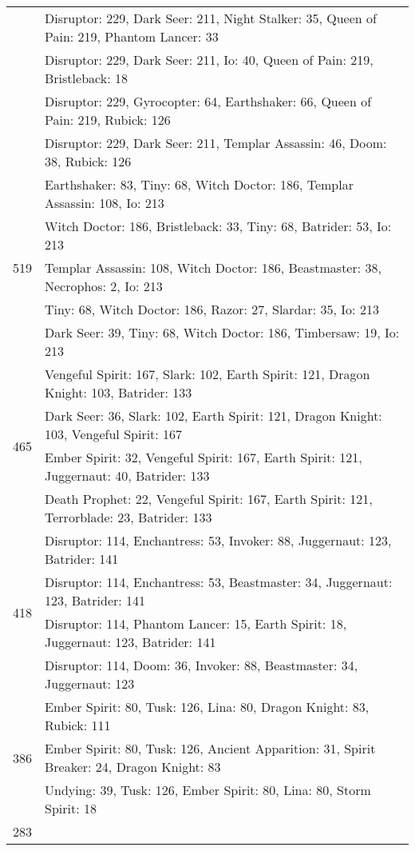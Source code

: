 \documentclass[result.tex]{subfiles}
\begin{document}
\begin{table}[H]
\begin{tabular}{ | c | p{12.5cm} | }
& Disruptor: 229, Dark Seer: 211, Night Stalker: 35, Queen of Pain: 219, Phantom Lancer: 33 \\
& Disruptor: 229, Dark Seer: 211, Io: 40, Queen of Pain: 219, Bristleback: 18 \\
& Disruptor: 229, Gyrocopter: 64, Earthshaker: 66, Queen of Pain: 219, Rubick: 126 \\
& Disruptor: 229, Dark Seer: 211, Templar Assassin: 46, Doom: 38, Rubick: 126 \\
\hline
\multirow{5}{*}{519}
& Earthshaker: 83, Tiny: 68, Witch Doctor: 186, Templar Assassin: 108, Io: 213 \\
& Witch Doctor: 186, Bristleback: 33, Tiny: 68, Batrider: 53, Io: 213 \\
& Templar Assassin: 108, Witch Doctor: 186, Beastmaster: 38, Necrophos: 2, Io: 213 \\
& Tiny: 68, Witch Doctor: 186, Razor: 27, Slardar: 35, Io: 213 \\
& Dark Seer: 39, Tiny: 68, Witch Doctor: 186, Timbersaw: 19, Io: 213 \\
\hline
\multirow{4}{*}{465}
& Vengeful Spirit: 167, Slark: 102, Earth Spirit: 121, Dragon Knight: 103, Batrider: 133 \\
& Dark Seer: 36, Slark: 102, Earth Spirit: 121, Dragon Knight: 103, Vengeful Spirit: 167 \\
& Ember Spirit: 32, Vengeful Spirit: 167, Earth Spirit: 121, Juggernaut: 40, Batrider: 133 \\
& Death Prophet: 22, Vengeful Spirit: 167, Earth Spirit: 121, Terrorblade: 23, Batrider: 133 \\
\hline
\multirow{4}{*}{418}
& Disruptor: 114, Enchantress: 53, Invoker: 88, Juggernaut: 123, Batrider: 141 \\
& Disruptor: 114, Enchantress: 53, Beastmaster: 34, Juggernaut: 123, Batrider: 141 \\
& Disruptor: 114, Phantom Lancer: 15, Earth Spirit: 18, Juggernaut: 123, Batrider: 141 \\
& Disruptor: 114, Doom: 36, Invoker: 88, Beastmaster: 34, Juggernaut: 123 \\
\hline
\multirow{3}{*}{386}
& Ember Spirit: 80, Tusk: 126, Lina: 80, Dragon Knight: 83, Rubick: 111 \\
& Ember Spirit: 80, Tusk: 126, Ancient Apparition: 31, Spirit Breaker: 24, Dragon Knight: 83 \\
& Undying: 39, Tusk: 126, Ember Spirit: 80, Lina: 80, Storm Spirit: 18 \\
\hline
\multirow{2}{*}{283}

\end{tabular}
\end{table}
\end{document}
